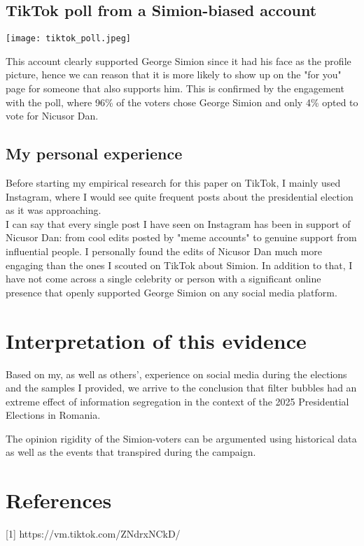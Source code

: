 \documentclass{article}
\begin{document}
\subsection{TikTok poll from a Simion-biased account}
\noindent
\begin{minipage}{0.3\textwidth}
  \texttt{[image: tiktok\_poll.jpeg]} %
\end{minipage}%
\hfill
\begin{minipage}{0.55\textwidth}
  This account clearly supported George Simion since it had his face as the profile picture, hence we can reason that it is more likely to show up on the "for you" page for someone that also supports him. This is confirmed by the engagement with the poll, where 96\% of the voters chose George Simion and only 4\% opted to vote for Nicusor Dan.
\end{minipage}

\subsection{My personal experience}

Before starting my empirical research for this paper on TikTok, I mainly used Instagram, where I would see quite frequent posts about the presidential election as it was approaching.
\\ I can say that every single post I have seen on Instagram has been in support of Nicusor Dan: from cool edits posted by "meme accounts" to genuine support from influential people. I personally found the edits of Nicusor Dan much more engaging than the ones I scouted on TikTok about Simion. In addition to that, I have not come across a single celebrity or person with a significant online presence that openly supported George Simion on any social media platform. 

\section{Interpretation of this evidence}

Based on my, as well as others', experience on social media during the elections and the samples I provided, we arrive to the conclusion that filter bubbles had an extreme effect of information segregation in the context of the 2025 Presidential Elections in Romania.

The opinion rigidity of the Simion-voters can be argumented using historical data as well as the events that transpired during the campaign.

\newpage

\section{References}

[1] https://vm.tiktok.com/ZNdrxNCkD/
\end{document}
